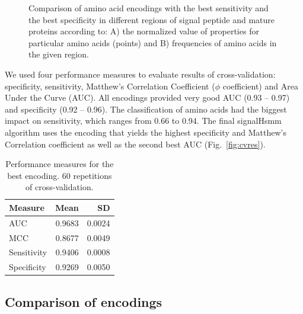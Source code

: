 \documentclass[10pt,letterpaper]{article}
\begin{document}
\begin{figure}[ht]\centering
\caption{Comparison of amino acid encodings with the best sensitivity and the best
specificity in different regions of signal peptide and mature proteins according to: A) the normalized value of properties for particular amino acids (points) and B) frequencies of amino acids in the given region.}
\label{fig:enccomp}
\end{figure}

We used four performance measures to evaluate results of cross-validation: specificity, sensitivity, Matthew's Correlation Coefficient ($\phi$ coefficient) and Area Under the Curve (AUC). All encodings provided very good AUC (0.93 -- 0.97) and specificity (0.92 -- 0.96). The classification of amino acids had the biggest impact on sensitivity, which ranges from 0.66 to 0.94. The final signalHsmm algorithm uses the encoding that yields the highest specificity and Matthew's Correlation coefficient as well as the second best AUC (Fig.~\ref{fig:cvres}).

\begin{table}[ht]
\small
\centering
\caption{Performance measures for the best encoding. 60 repetitions of cross-validation.} 
\begin{tabular}{lrr}
  \toprule
Measure & Mean & SD \\ 
  \midrule
AUC & 0.9683 & 0.0024 \\ 
   \rowcolor[gray]{0.85}MCC & 0.8677 & 0.0049 \\ 
  Sensitivity & 0.9406 & 0.0008 \\ 
   \rowcolor[gray]{0.85}Specificity & 0.9269 & 0.0050 \\ 
   \bottomrule
\end{tabular}
\label{tab:perfmeas}
\end{table}

\subsection*{Comparison of encodings}
\end{document}
